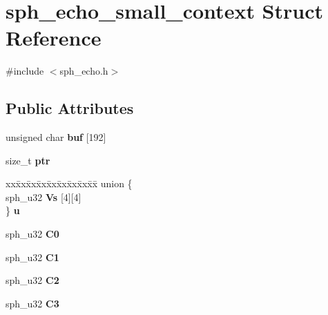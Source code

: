 \hypertarget{structsph__echo__small__context}{}\section{sph\+\_\+echo\+\_\+small\+\_\+context Struct Reference}
\label{structsph__echo__small__context}


{\ttfamily \#include $<$sph\+\_\+echo.\+h$>$}

\subsection*{Public Attributes}
\begin{DoxyCompactItemize}
\item 
\mbox{\label{structsph__echo__small__context_a3f8860cea15c19c4104a04c361d6e0e3}} 
unsigned char {\bfseries buf} \mbox{[}192\mbox{]}
\item 
\mbox{\label{structsph__echo__small__context_a61f2cdfc94d4e1c647f863a273d1867a}} 
size\+\_\+t {\bfseries ptr}
\item 
\mbox{\label{structsph__echo__small__context_a381c17fde85be79abff87d1992686f89}} 
\begin{tabbing}
xx\=xx\=xx\=xx\=xx\=xx\=xx\=xx\=xx\=\kill
union \{\\
\>sph\_u32 {\bfseries Vs} \mbox{[}4\mbox{]}\mbox{[}4\mbox{]}\\
\} {\bfseries u}\\

\end{tabbing}\item 
\mbox{\label{structsph__echo__small__context_a007c0c8be672e98a304a2e4bf1e8a216}} 
sph\+\_\+u32 {\bfseries C0}
\item 
\mbox{\label{structsph__echo__small__context_a8d98cb760389f19f02d171d3b139990f}} 
sph\+\_\+u32 {\bfseries C1}
\item 
\mbox{\label{structsph__echo__small__context_a0a123b6140cfd676d780b18bd51eb064}} 
sph\+\_\+u32 {\bfseries C2}
\item 
\mbox{\label{structsph__echo__small__context_a37db2699ca21097fa310489e57ebcfda}} 
sph\+\_\+u32 {\bfseries C3}
\end{DoxyCompactItemize}


